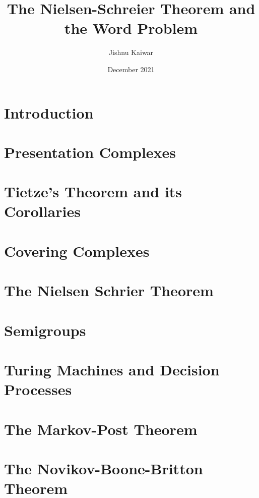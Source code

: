 \documentclass{article}
\title{The Nielsen-Schreier Theorem and the Word Problem}
\author{Jishnu Kaiwar}
\date{December 2021}
\begin{document}
\maketitle

\section{Introduction}
\section{Presentation Complexes}
\section{Tietze's Theorem and its Corollaries}
\section{Covering Complexes}
\section{The Nielsen Schrier Theorem}
\section{Semigroups}
\section{Turing Machines and Decision Processes}
\section{The Markov-Post Theorem}
\section{The Novikov-Boone-Britton Theorem}
\nocite{rotman1999introduction}



\end{document}
